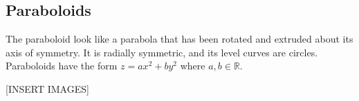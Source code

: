 \subsection{Paraboloids}
\noindent
The paraboloid look like a parabola that has been rotated and extruded about its axis of symmetry. It is radially symmetric, and its level curves are circles. Paraboloids have the form $z=ax^2+by^2$ where $a,b\in\mathbb{R}$.

[INSERT IMAGES]